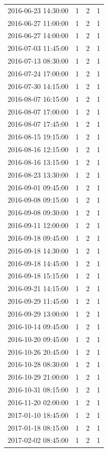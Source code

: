 \begin{tabular}{lrrr}
2016-06-23 14:30:00 & 1 & 2 & 1 \\
2016-06-27 11:00:00 & 1 & 2 & 1 \\
2016-06-27 14:00:00 & 1 & 2 & 1 \\
2016-07-03 11:45:00 & 1 & 2 & 1 \\
2016-07-13 08:30:00 & 1 & 2 & 1 \\
2016-07-24 17:00:00 & 1 & 2 & 1 \\
2016-07-30 14:15:00 & 1 & 2 & 1 \\
2016-08-07 16:15:00 & 1 & 2 & 1 \\
2016-08-07 17:00:00 & 1 & 2 & 1 \\
2016-08-07 17:45:00 & 1 & 2 & 1 \\
2016-08-15 19:15:00 & 1 & 2 & 1 \\
2016-08-16 12:15:00 & 1 & 2 & 1 \\
2016-08-16 13:15:00 & 1 & 2 & 1 \\
2016-08-23 13:30:00 & 1 & 2 & 1 \\
2016-09-01 09:45:00 & 1 & 2 & 1 \\
2016-09-08 09:15:00 & 1 & 2 & 1 \\
2016-09-08 09:30:00 & 1 & 2 & 1 \\
2016-09-11 12:00:00 & 1 & 2 & 1 \\
2016-09-18 09:45:00 & 1 & 2 & 1 \\
2016-09-18 14:30:00 & 1 & 2 & 1 \\
2016-09-18 14:45:00 & 1 & 2 & 1 \\
2016-09-18 15:15:00 & 1 & 2 & 1 \\
2016-09-21 14:15:00 & 1 & 2 & 1 \\
2016-09-29 11:45:00 & 1 & 2 & 1 \\
2016-09-29 13:00:00 & 1 & 2 & 1 \\
2016-10-14 09:45:00 & 1 & 2 & 1 \\
2016-10-20 09:45:00 & 1 & 2 & 1 \\
2016-10-26 20:45:00 & 1 & 2 & 1 \\
2016-10-28 08:30:00 & 1 & 2 & 1 \\
2016-10-29 21:00:00 & 1 & 2 & 1 \\
2016-10-31 08:15:00 & 1 & 2 & 1 \\
2016-11-20 02:00:00 & 1 & 2 & 1 \\
2017-01-10 18:45:00 & 1 & 2 & 1 \\
2017-01-18 08:15:00 & 1 & 2 & 1 \\
2017-02-02 08:45:00 & 1 & 2 & 1 \\

\end{tabular}
